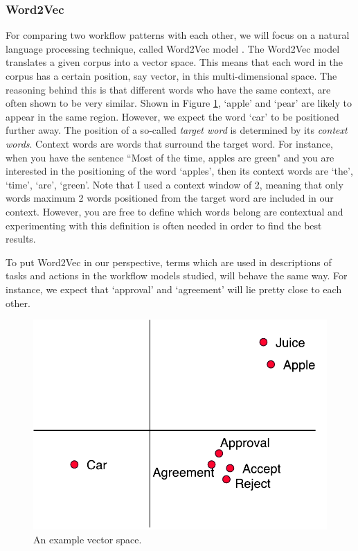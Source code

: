 \documentclass[a4paper,11pt]{article}
\begin{document}
\subsubsection{Word2Vec}
\label{section:word2vec}
For comparing two workflow patterns with each other, we will focus on a natural language processing technique, called Word2Vec model \cite{Mikolov2013aWord2Vec,Mikolov2013bWord2Vec}. The Word2Vec model translates a given corpus into a vector space. This means that each word in the corpus has a certain position, say vector, in this multi-dimensional space. The reasoning behind this is that different words who have the same context, are often shown to be very similar. Shown in Figure \ref{figure:word2vec_example}, `apple' and `pear' are likely to appear in the same region. However, we expect the word `car' to be positioned further away. The position of a so-called \textit{target word} is determined by its \textit{context words}. Context words are words that surround the target word. For instance, when you have the sentence ``Most of the time, apples are green" and you are interested in the positioning of the word `apples', then its context words are `the', `time', `are', `green'. Note that I used a context window of 2, meaning that only words maximum 2 words positioned from the target word are included in our context. However, you are free to define which words belong are contextual and experimenting with this definition is often needed in order to find the best results. 

To put Word2Vec in our perspective, terms which are used in descriptions of tasks and actions in the workflow models studied, will behave the same way. For instance, we expect that `approval' and `agreement' will lie pretty close to each other.

\begin{figure}[H]
\centering
\includegraphics[width=0.6\linewidth]{word2vec_example.pdf}
\caption{An example vector space.}
\label{figure:word2vec_example}
\end{figure}
\end{document}
